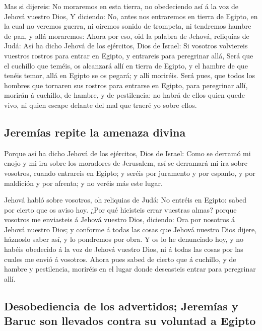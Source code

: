  Mas si dijereis: No moraremos en esta tierra, no
obedeciendo así á la voz de Jehová vuestro Dios,  Y
diciendo: No, antes nos entraremos en tierra de Egipto, en la cual no
veremos guerra, ni oiremos sonido de trompeta, ni tendremos hambre de
pan, y allá moraremos:  Ahora por eso, oid la palabra de
Jehová, reliquias de Judá: Así ha dicho Jehová de los ejércitos, Dios de
Israel: Si vosotros volviereis vuestros rostros para entrar en Egipto, y
entrareis para peregrinar allá,  Será que el cuchillo que
teméis, os alcanzará allí en tierra de Egipto, y el hambre de que tenéis
temor, allá en Egipto se os pegará; y allí moriréis. 
Será pues, que todos los hombres que tornaren sus rostros para entrarse
en Egipto, para peregrinar allí, morirán á cuchillo, de hambre, y de
pestilencia: no habrá de ellos quien quede vivo, ni quien escape delante
del mal que traeré yo sobre ellos.

\hypertarget{jeremuxedas-repite-la-amenaza-divina}{%
\subsection{Jeremías repite la amenaza
divina}\label{jeremuxedas-repite-la-amenaza-divina}}

 Porque así ha dicho Jehová de los ejércitos, Dios de
Israel: Como se derramó mi enojo y mi ira sobre los moradores de
Jerusalem, así se derramará mi ira sobre vosotros, cuando entrareis en
Egipto; y seréis por juramento y por espanto, y por maldición y por
afrenta; y no veréis más este lugar.

 Jehová habló sobre vosotros, oh reliquias de Judá: No
entréis en Egipto: sabed por cierto que os aviso hoy. 
¿Por qué hicisteis errar vuestras almas? porque vosotros me enviasteis á
Jehová vuestro Dios, diciendo: Ora por nosotros á Jehová nuestro Dios; y
conforme á todas las cosas que Jehová nuestro Dios dijere, háznoslo
saber así, y lo pondremos por obra.  Y os lo he
denunciado hoy, y no habéis obedecido á la voz de Jehová vuestro Dios,
ni á todas las cosas por las cuales me envió á vosotros. 
Ahora pues sabed de cierto que á cuchillo, y de hambre y pestilencia,
moriréis en el lugar donde deseasteis entrar para peregrinar allí.

\hypertarget{desobediencia-de-los-advertidos-jeremuxedas-y-baruc-son-llevados-contra-su-voluntad-a-egipto}{%
\subsection{Desobediencia de los advertidos; Jeremías y Baruc son
llevados contra su voluntad a
Egipto}\label{desobediencia-de-los-advertidos-jeremuxedas-y-baruc-son-llevados-contra-su-voluntad-a-egipto}}

